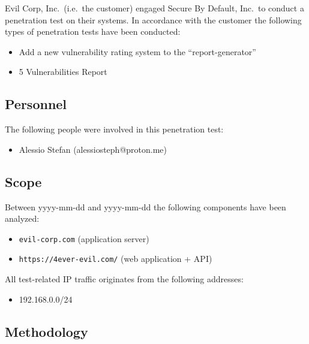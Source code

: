 \documentclass[a4paper]{article}
\newcommand{\passthrough}[1]{\colorbox{code}{\lstset{mathescape=false}#1}}
\begin{document}
Evil Corp, Inc.\ (i.e.\ the customer) engaged Secure By Default, Inc.\ to conduct a penetration test on their systems.
In accordance with the customer the following types of penetration tests have been conducted:

\begin{itemize}
      \item Add a new vulnerability rating system to the ``report-generator''

      \item 5 Vulnerabilities Report

  \end{itemize}

\subsection{Personnel}

The following people were involved in this penetration test:

\begin{itemize}
      \item Alessio Stefan (alessiosteph@proton.me)

  \end{itemize}

\subsection{Scope}

Between yyyy-mm-dd and yyyy-mm-dd the following components have been analyzed:

\begin{itemize}
      \item \passthrough{\lstinline!evil-corp.com!} (application server)

      \item \passthrough{\lstinline!https://4ever-evil.com/!} (web application + API)

  \end{itemize}

All test-related IP traffic originates from the following addresses:

\begin{itemize}
  \item \passthrough{192.168.0.0/24}
\end{itemize}

\subsection{Methodology}
\end{document}
